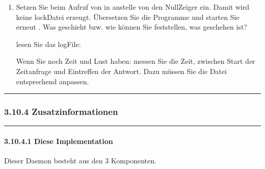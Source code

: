 \documentclass[a4paper,10pt,english]{report}
\begin{document}
\begin{enumerate}
\begin{sphinxVerbatim}[commandchars=\\\{\}]

\end{sphinxVerbatim}

\item {} 
\sphinxAtStartPar
Setzen Sie beim Aufruf von  in  anstelle von  den Null\sphinxhyphen{}Zeiger  ein. Damit wird keine lock\sphinxhyphen{}Datei erzeugt. Übersetzen Sie die Programme und starten Sie erneut . Was geschieht bzw. wie können Sie feststellen, was geschehen ist?

\sphinxAtStartPar
{} lesen Sie das log\sphinxhyphen{}File: 

\begin{sphinxVerbatim}[commandchars=\\\{\}]

\end{sphinxVerbatim}

\sphinxAtStartPar
Wenn Sie noch Zeit und Lust haben: messen Sie die Zeit, zwischen Start der Zeitanfrage und Eintreffen der Antwort. Dazu müssen Sie die Datei  entsprechend anpassen.

\end{enumerate}


\bigskip\hrule\bigskip



\subsubsection{3.10.4 Zusatzinformationen}
\label{\detokenize{P07_Prozesse_und_Threads/README:zusatzinformationen}}

\bigskip\hrule\bigskip



\paragraph{3.10.4.1	Diese Implementation}
\label{\detokenize{P07_Prozesse_und_Threads/README:diese-implementation}}
\sphinxAtStartPar
Dieser Daemon besteht aus den 3 Komponenten.

\sphinxAtStartPar
{}
\end{document}
